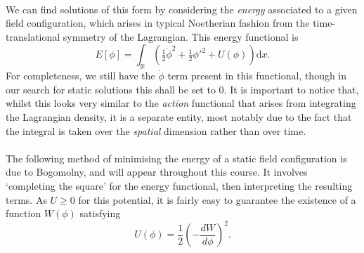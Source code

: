 \documentclass[11pt, fleqn]{article}
\begin{document}
\paragraph{} We can find solutions of this form by considering the \textit{energy} associated to a given field configuration, which arises in typical Noetherian fashion from the time-translational symmetry of the Lagrangian. This energy functional is
	\begin{equation}\label{eq:phi4energy}
		E [ \phi ] = \int_\mathbb{R} \left( \tfrac{1}{2} \dot{\phi}^2 + \tfrac{1}{2} \phi '^2 + U(\phi) \right) \mathrm{d}x.
	\end{equation}
For completeness, we still have the $ \dot{\phi} $ term present in this functional, though in our search for static solutions this shall be set to $ 0 $. It is important to notice that, whilst this looks very similar to the \textit{action} functional that arises from integrating the Lagrangian density, it is a separate entity, most notably due to the fact that the integral is taken over the \textit{spatial} dimension rather than over time.

\paragraph{} The following method of minimising the energy of a static field configuration is due to Bogomolny, and will appear throughout this course. It involves `completing the square' for the energy functional, then interpreting the resulting terms. As $ U \geq 0 $ for this potential, it is fairly easy to guarantee the existence of a function $ W(\phi) $ satisfying
	\begin{equation}\label{key}
		U(\phi) = \frac{1}{2} \left( - \frac{d W}{d \phi} \right)^2.
	\end{equation}
\end{document}
